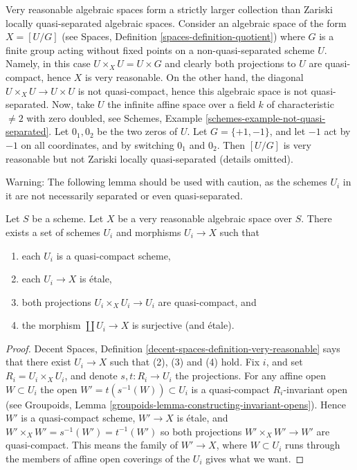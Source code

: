 \begin{remark}
\label{remark-very-reasonable-Zariski-locally-quasi-separated}
Very reasonable algebraic spaces form a strictly larger collection than
Zariski locally quasi-separated algebraic spaces. Consider
an algebraic space of the form $X = [U/G]$ (see
Spaces, Definition \ref{spaces-definition-quotient})
where $G$ is a finite group acting without fixed points on a
non-quasi-separated scheme $U$. Namely, in this case
$U \times_X U = U \times G$ and clearly both projections to $U$ are
quasi-compact, hence $X$ is very reasonable. On the other hand, the diagonal
$U \times_X U \to U \times U$ is not quasi-compact, hence this
algebraic space is not quasi-separated. Now, take $U$ the infinite
affine space over a field $k$ of characteristic $\not = 2$ with
zero doubled, see
Schemes, Example \ref{schemes-example-not-quasi-separated}.
Let $0_1, 0_2$ be the two zeros of $U$. Let $G = \{+1, -1\}$, and
let $-1$ act by $-1$ on all coordinates, and by switching
$0_1$ and $0_2$. Then $[U/G]$ is very reasonable but not Zariski locally
quasi-separated (details omitted).
\end{remark}

\noindent
Warning: The following lemma should be used with caution, as the schemes
$U_i$ in it are not necessarily separated or even quasi-separated.

\begin{lemma}
\label{lemma-very-reasonable-quasi-compact-pieces}
Let $S$ be a scheme.
Let $X$ be a very reasonable algebraic space over $S$.
There exists a set of schemes
$U_i$ and morphisms $U_i \to X$ such that
\begin{enumerate}
\item each $U_i$ is a quasi-compact scheme,
\item each $U_i \to X$ is \'etale,
\item both projections $U_i \times_X U_i \to U_i$ are quasi-compact, and
\item the morphism $\coprod U_i \to X$ is surjective (and \'etale).
\end{enumerate}
\end{lemma}

\begin{proof}
Decent Spaces, Definition \ref{decent-spaces-definition-very-reasonable}
says that there exist $U_i \to X$ such that (2), (3) and (4) hold.
Fix $i$, and set $R_i = U_i \times_X U_i$, and denote $s, t : R_i \to U_i$
the projections.
For any affine open $W \subset U_i$ the open $W' = t(s^{-1}(W)) \subset U_i$
is a quasi-compact $R_i$-invariant open (see
Groupoids, Lemma \ref{groupoids-lemma-constructing-invariant-opens}).
Hence $W'$ is a quasi-compact scheme, $W' \to X$ is \'etale, and
$W' \times_X W' = s^{-1}(W') = t^{-1}(W')$ so both projections
$W' \times_X W' \to W'$ are quasi-compact. This means the family of
$W' \to X$, where $W \subset U_i$ runs through the members of affine
open coverings of the $U_i$ gives what we want.
\end{proof}




